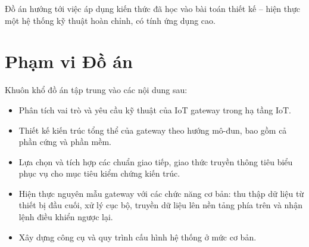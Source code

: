         Đồ án hướng tới việc áp dụng kiến thức đã học vào bài toán thiết kế – hiện thực một hệ thống kỹ thuật hoàn chỉnh, có tính ứng dụng cao.
    \section{Phạm vi Đồ án}
        Khuôn khổ đồ án tập trung vào các nội dung sau:
        \begin{itemize}
            \item Phân tích vai trò và yêu cầu kỹ thuật của IoT gateway trong hạ tầng IoT.
            \item Thiết kế kiến trúc tổng thể của gateway theo hướng mô-đun, bao gồm cả phần cứng và phần mềm.
            \item Lựa chọn và tích hợp các chuẩn giao tiếp, giao thức truyền thông tiêu biểu phục vụ cho mục tiêu kiểm chứng kiến trúc.
            \item Hiện thực nguyên mẫu gateway với các chức năng cơ bản: thu thập dữ liệu từ thiết bị đầu cuối, xử lý cục bộ, truyền dữ liệu lên nền tảng phía trên và nhận lệnh điều khiển ngược lại.
            \item Xây dựng công cụ và quy trình cấu hình hệ thống ở mức cơ bản.
        \end{itemize}
    

        
